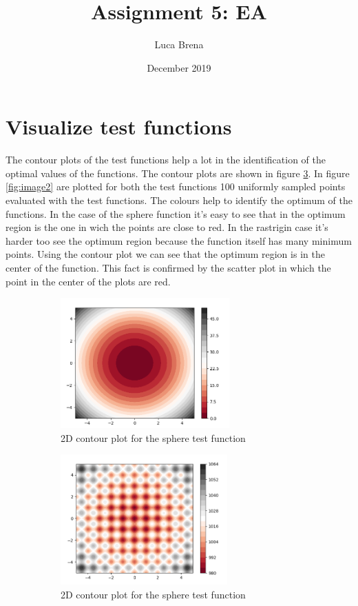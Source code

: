 \documentclass{article}
\title{Assignment 5: EA}
\author{Luca Brena}
\date{December 2019}
\begin{document}
\maketitle

\section{Visualize test functions}
The contour plots of the test functions help a lot in the identification of the optimal values of the functions. The contour plots are shown in figure \ref{fig:image1}. In figure \ref{fig:image2} are plotted for both the test functions 100 uniformly sampled points evaluated with the test functions. The colours help to identify the optimum of the functions. In the case of the sphere function it's easy to see that in the optimum region is the one in wich the points are close to red. In the rastrigin case it's harder too see the optimum region because the function itself has many minimum points. Using the contour plot we can see that the optimum region is in the center of the function. This fact is confirmed by the scatter plot in which the point in the center of the plots are red. 

\begin{figure}[h]
	
	\begin{subfigure}{0.5\textwidth}
		\includegraphics[width=0.9\linewidth, height=5cm]{sphere_contour.PNG} 
		\caption{2D contour plot for the sphere test function}
		\label{fig:subim1}
	\end{subfigure}
	\begin{subfigure}{0.5\textwidth}
		\includegraphics[width=0.9\linewidth, height=5cm]{rastrigin_contour.PNG}
		\caption{2D contour plot for the sphere test function}
		\label{fig:subim2}
	\end{subfigure}
	
	\caption{ }
	\label{fig:image1}
\end{figure}
\end{document}
